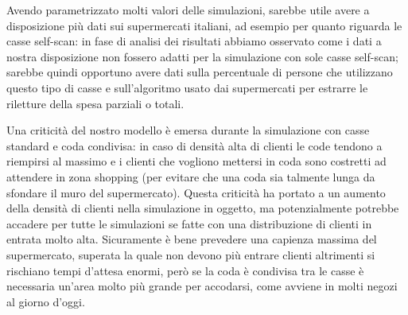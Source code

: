 Avendo parametrizzato molti valori delle simulazioni, sarebbe utile avere a disposizione più dati sui supermercati italiani, ad esempio per quanto riguarda le casse self-scan: in fase di analisi dei risultati abbiamo osservato come i dati a nostra disposizione non fossero adatti per la simulazione con sole casse self-scan; sarebbe quindi opportuno avere dati sulla percentuale di persone che utilizzano questo tipo di casse e sull'algoritmo usato dai supermercati per estrarre le riletture della spesa parziali o totali.

Una criticità del nostro modello è emersa durante la simulazione con casse standard e coda condivisa: in caso di densità alta di clienti le code tendono a riempirsi al massimo e i clienti che vogliono mettersi in coda sono costretti ad attendere in zona shopping (per evitare che una coda sia talmente lunga da sfondare il muro del supermercato). Questa criticità ha portato a un aumento della densità di clienti nella simulazione in oggetto, ma potenzialmente potrebbe accadere per tutte le simulazioni se fatte con una distribuzione di clienti in entrata molto alta. Sicuramente è bene prevedere una capienza massima del supermercato, superata la quale non devono più entrare clienti altrimenti si rischiano tempi d'attesa enormi, però se la coda è condivisa tra le casse è necessaria un'area molto più grande per accodarsi, come avviene in molti negozi al giorno d'oggi.